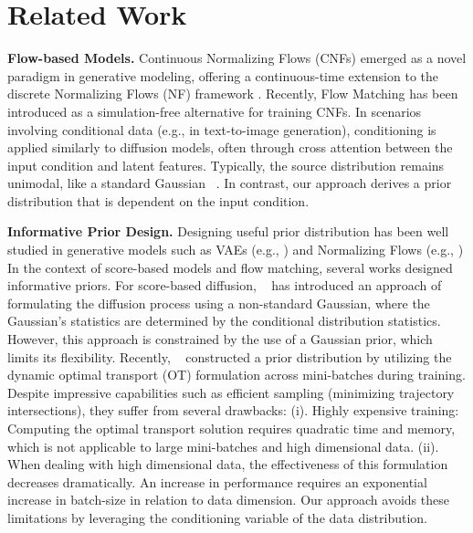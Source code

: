 \section{Related Work}
\noindent \textbf{Flow-based Models.} \quad
Continuous Normalizing Flows (CNFs) \citep{chen2019neural} emerged as a novel paradigm in generative modeling, offering a continuous-time extension to the discrete Normalizing Flows (NF) framework \citep{kobyzev2020normalizing, papamakarios2021normalizing}. 
Recently, Flow Matching \citep{lipman2022flow, liu2022flow, albergo2022building} has been introduced as a simulation-free alternative for training CNFs.
In scenarios involving conditional data (e.g., in text-to-image generation), conditioning is applied similarly to diffusion models, often through cross attention between the input condition and latent features. Typically, the source distribution remains unimodal, like a standard Gaussian ~\citep{liu2024generative}. In contrast, our approach derives a prior distribution that is dependent on the input condition.





\noindent \textbf{Informative Prior Design.} \quad
Designing useful prior distribution has been well studied in generative models such as VAEs (e.g., \cite{dilokthanakul2016deep}) and Normalizing Flows (e.g., \cite{izmailov2020semi})
In the context of score-based models and flow matching, several works designed informative priors. 
For score-based diffusion, ~\cite{lee2021priorgrad} has introduced an approach of formulating the diffusion process using a non-standard Gaussian, where the Gaussian's statistics are determined by the conditional distribution statistics. 
However, this approach is constrained by the use of a Gaussian prior, which limits its flexibility.
Recently, ~\cite{pooladian2023multisample, tong2023improving} constructed a prior distribution by utilizing the dynamic optimal transport (OT) formulation across mini-batches during training. Despite impressive capabilities such as efficient sampling (minimizing trajectory intersections), they suffer from several drawbacks: (i). Highly expensive training: Computing the optimal transport solution requires quadratic time and memory, which is not applicable to large mini-batches and high dimensional data. (ii). When dealing with high dimensional data, the effectiveness of this formulation decreases dramatically. An increase in performance requires an exponential increase in batch-size in relation to data dimension. 
Our approach avoids these limitations by leveraging the conditioning variable of the data distribution.